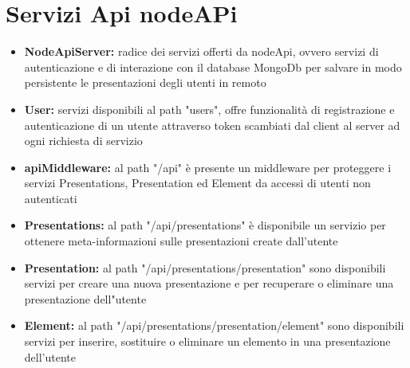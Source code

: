 \section{Servizi Api nodeAPi}{
\begin{itemize}

	\item \textbf{NodeApiServer:} radice dei servizi offerti da nodeApi, ovvero servizi di autenticazione e di interazione con il database MongoDb per salvare in modo persistente le presentazioni degli utenti in remoto
	
	\item \textbf{User:} servizi disponibili al path "users", offre funzionalità di registrazione e autenticazione di un utente attraverso token scambiati dal client al server ad ogni richiesta di servizio

	\item \textbf{apiMiddleware:} al path "/api" è presente un middleware per proteggere i servizi Presentations, Presentation ed Element da accessi di utenti non autenticati

	\item \textbf{Presentations:} al path "/api/presentations" è disponibile un servizio per ottenere meta-informazioni sulle presentazioni create dall'utente 

	\item \textbf{Presentation:} al path "/api/presentations/presentation" sono disponibili servizi per creare una nuova presentazione e per recuperare o eliminare una presentazione dell"utente
	
	\item \textbf{Element:} al path "/api/presentations/presentation/element" sono disponibili servizi per inserire, sostituire o eliminare un elemento in una presentazione dell'utente
\end{itemize}
}
